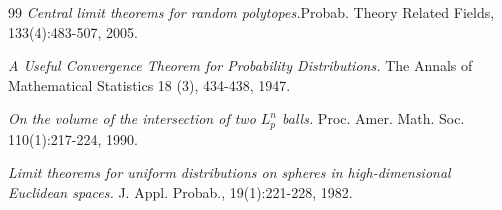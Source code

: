 \documentclass[10pt]{amsart}
\newcounter{theor}
\numberwithin{equation}{section}
\begin{document}
\begin{thebibliography}{99}
 \textit{Central limit theorems for random polytopes.}Probab. Theory Related Fields, 133(4):483-507, 2005.

 \textit{ A Useful Convergence Theorem for Probability Distributions.} The Annals of Mathematical Statistics 18 (3), 434-438, 1947.

 \textit{ On the volume of the intersection of two $L_p^n$ balls.} Proc. Amer. Math. Soc. 110(1):217-224, 1990.

 \textit{Limit theorems for uniform distributions on spheres in high-dimensional Euclidean spaces.} J. Appl. Probab., 19(1):221-228, 1982.









\end{thebibliography}
\end{document}

